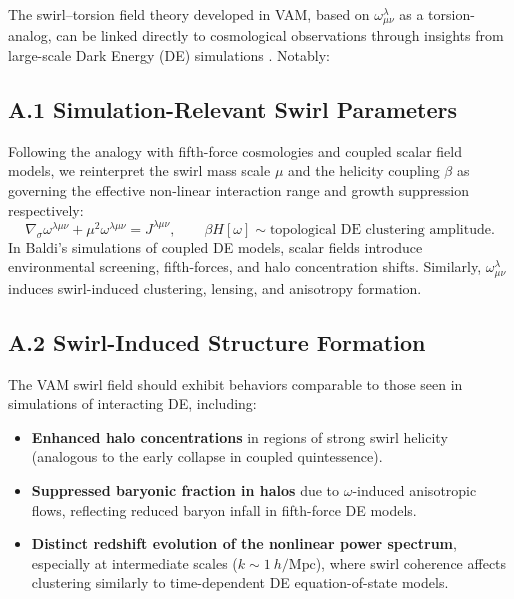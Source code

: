 \documentclass[11pt]{article}
\begin{document}
    The swirl–torsion field theory developed in VAM, based on $\omega^\lambda_{\mu\nu}$ as a torsion-analog, can be linked directly to cosmological observations through insights from large-scale Dark Energy (DE) simulations \cite{baldi2012dark}. Notably:

    \subsection*{A.1 Simulation-Relevant Swirl Parameters}
    Following the analogy with fifth-force cosmologies and coupled scalar field models, we reinterpret the swirl mass scale $\mu$ and the helicity coupling $\beta$ as governing the effective non-linear interaction range and growth suppression respectively:
    \[
        \nabla_\sigma \omega^{\lambda\mu\nu} + \mu^2 \omega^{\lambda\mu\nu} = J^{\lambda\mu\nu}, \qquad
        \beta H[\omega] \sim \text{topological DE clustering amplitude}.
    \]
    In Baldi’s simulations of coupled DE models, scalar fields introduce environmental screening, fifth-forces, and halo concentration shifts. Similarly, $\omega^{\lambda}_{\mu\nu}$ induces swirl-induced clustering, lensing, and anisotropy formation.

    \subsection*{A.2 Swirl-Induced Structure Formation}
    The VAM swirl field should exhibit behaviors comparable to those seen in simulations of interacting DE, including:
    \begin{itemize}
        \item \textbf{Enhanced halo concentrations} in regions of strong swirl helicity (analogous to the early collapse in coupled quintessence).
        \item \textbf{Suppressed baryonic fraction in halos} due to $\omega$-induced anisotropic flows, reflecting reduced baryon infall in fifth-force DE models.
        \item \textbf{Distinct redshift evolution of the nonlinear power spectrum}, especially at intermediate scales ($k \sim 1~h/\mathrm{Mpc}$), where swirl coherence affects clustering similarly to time-dependent DE equation-of-state models.
    \end{itemize}
\end{document}
